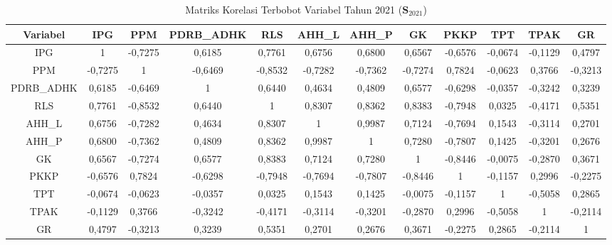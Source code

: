\begin{table}[H]
\centering
\caption{Matriks Korelasi Terbobot Variabel Tahun 2021 ($\mathbf{S}_{2021}$)} \label{tab:app1matriks_intra_loading_2021}
\begin{adjustbox}{max width=\textwidth, max height=0.85\textheight}
\begin{tabular}{|c|c|c|c|c|c|c|c|c|c|c|c|}
\hline
\textbf{Variabel} & \textbf{IPG} & \textbf{PPM} & \textbf{PDRB\_ADHK} & \textbf{RLS} & \textbf{AHH\_L} & \textbf{AHH\_P} & \textbf{GK} & \textbf{PKKP} & \textbf{TPT} & \textbf{TPAK} & \textbf{GR} \\
\hline
IPG & 1 & -0,7275 & 0,6185 & 0,7761 & 0,6756 & 0,6800 & 0,6567 & -0,6576 & -0,0674 & -0,1129 & 0,4797 \\
PPM & -0,7275 & 1 & -0,6469 & -0,8532 & -0,7282 & -0,7362 & -0,7274 & 0,7824 & -0,0623 & 0,3766 & -0,3213 \\
PDRB\_ADHK & 0,6185 & -0,6469 & 1 & 0,6440 & 0,4634 & 0,4809 & 0,6577 & -0,6298 & -0,0357 & -0,3242 & 0,3239 \\
RLS & 0,7761 & -0,8532 & 0,6440 & 1 & 0,8307 & 0,8362 & 0,8383 & -0,7948 & 0,0325 & -0,4171 & 0,5351 \\
AHH\_L & 0,6756 & -0,7282 & 0,4634 & 0,8307 & 1 & 0,9987 & 0,7124 & -0,7694 & 0,1543 & -0,3114 & 0,2701 \\
AHH\_P & 0,6800 & -0,7362 & 0,4809 & 0,8362 & 0,9987 & 1 & 0,7280 & -0,7807 & 0,1425 & -0,3201 & 0,2676 \\
GK & 0,6567 & -0,7274 & 0,6577 & 0,8383 & 0,7124 & 0,7280 & 1 & -0,8446 & -0,0075 & -0,2870 & 0,3671 \\
PKKP & -0,6576 & 0,7824 & -0,6298 & -0,7948 & -0,7694 & -0,7807 & -0,8446 & 1 & -0,1157 & 0,2996 & -0,2275 \\
TPT & -0,0674 & -0,0623 & -0,0357 & 0,0325 & 0,1543 & 0,1425 & -0,0075 & -0,1157 & 1 & -0,5058 & 0,2865 \\
TPAK & -0,1129 & 0,3766 & -0,3242 & -0,4171 & -0,3114 & -0,3201 & -0,2870 & 0,2996 & -0,5058 & 1 & -0,2114 \\
GR & 0,4797 & -0,3213 & 0,3239 & 0,5351 & 0,2701 & 0,2676 & 0,3671 & -0,2275 & 0,2865 & -0,2114 & 1 \\
\hline
\end{tabular}
\end{adjustbox}
\end{table}